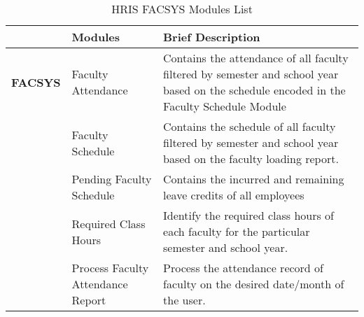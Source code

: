 \begin{table}[H]
\begin{tabular}{@{}p{2cm}p{3.5cm}p{9cm}@{}}
\toprule
\multicolumn{1}{l}{} & \textbf{Modules}                  & \textbf{Brief Description}                                                                                                               \\ \midrule
\textbf{FACSYS}      & Faculty Attendance                & Contains the attendance of all faculty filtered by semester and school year based on the schedule encoded in the Faculty Schedule Module \\
                        & Faculty Schedule                  & Contains the schedule of all faculty filtered by semester and school year based on the faculty loading report.                           \\
                        & Pending Faculty Schedule          & Contains the incurred and remaining leave credits of all employees                                                                       \\
                        & Required Class Hours              & Identify the required class hours of each faculty for the particular semester and school year.                                           \\
                        & Process Faculty Attendance Report & Process the attendance record of faculty on the desired date/month of the user.                                                          \\ \bottomrule
\end{tabular}
\caption{HRIS FACSYS Modules List}
\label{tab:my_label}
\end{table}
    